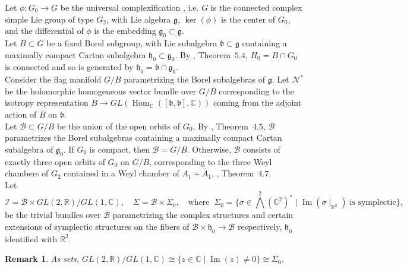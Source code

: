 \documentclass[10pt]{article}
\newtheorem{remark}[theorem]{Remark}
\begin{document}
Let $\phi\colon G_0\to G$ be the universal complexification \cite{Hochschild}, i.e. $G$ is the connected complex simple Lie group of type $G_2$, with Lie algebra $\mathfrak{g}$, $\operatorname{ker}(\phi)$ is the center of $G_0$, and the differential of $\phi$ is the embedding $\mathfrak{g}_0\subset \mathfrak{g}$.\\

Let $B\subset G$ be a fixed Borel subgroup, with Lie subalgebra $\mathfrak{b}\subset \mathfrak{g}$ containing a maximally compact Cartan subalgebra $\mathfrak{h}_0\subset \mathfrak{g}_0$. By \cite{Wolf}, Theorem~$5.4$, $H_0=B\cap G_0$ is connected and so is generated by $\mathfrak{h}_0=\mathfrak{b}\cap \mathfrak{g}_0$.\\

Consider the flag manifold $G/B$ parametrizing the Borel subalgebras of $\mathfrak{g}$. Let $\mathcal{N}^{*}$ be the holomorphic homogeneous vector bundle over $G/B$ corresponding to the isotropy representation $B\to GL(\operatorname{Hom}_{\mathbb C}([\mathfrak{b},\mathfrak{b}],\mathbb C))$ coming from the adjoint action of $B$ on $\mathfrak{b}$.\\

Let $\mathcal{B}\subset G/B$ be the union of the open orbits of $G_0$. By \cite{Wolf}, Theorem~$4.5$, $\mathcal{B}$ parametrizes the Borel subalgebras containing a maximally compact Cartan subalgebra of $\mathfrak{g}_0$. If $G_0$ is compact, then $\mathcal{B}= G/B$. Otherwise, $\mathcal{B}$ consists of exactly three open orbits of $G_0$ on $G/B$, corresponding to the three Weyl chambers of $G_2$ contained in a Weyl chamber of $A_1+\tilde{A_1}$, \cite{Wolf}, Theorem~$4.7$.\\

Let 
$$
\mathcal{I}=\mathcal{B}\times GL(2,\mathbb R)/GL(1,\mathbb C), \quad \Sigma =\mathcal{B}\times {\Sigma}_0,\quad \mbox{where}\;\; {\Sigma}_0 = \{ \sigma \in \bigwedge ^2 ({\mathbb C }^{2})^{*}  \mid \operatorname{Im}(\sigma {\mid}_{{\mathbb R}^{2}}) \; \mbox{is symplectic} \},
$$
be the trivial bundles over $\mathcal{B}$ parametrizing the complex structures and certain extensions of symplectic structures on the fibers of $\mathcal{B}\times \mathfrak{h}_0\to \mathcal{B}$ respectively, $\mathfrak{h}_0$ identified with ${\mathbb R}^{2}$.\\

\begin{remark}
As sets, $GL(2,\mathbb R)/GL(1,\mathbb C) \cong \{ z\in \mathbb C \mid \operatorname{Im}(z)\neq 0 \} \cong {\Sigma}_0$.
\end{remark}
\end{document}
